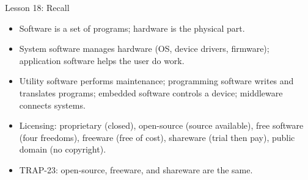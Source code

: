 \documentclass[aspectratio=169]{beamer}
\begin{document}
\begin{frame}{Lesson 18: Recall}
  \begin{itemize}
    \item Software is a set of programs; hardware is the physical part.
    \item System software manages hardware (OS, device drivers, firmware);
      application software helps the user do work.
    \item Utility software performs maintenance; programming software writes
      and translates programs; embedded software controls a device;
      middleware connects systems.
    \item Licensing: proprietary (closed), open-source (source available),
      free software (four freedoms), freeware (free of cost), shareware
      (trial then pay), public domain (no copyright).
    \item TRAP-23: open-source, freeware, and shareware are  the
      same.
  \end{itemize}
\end{frame}
\end{document}
